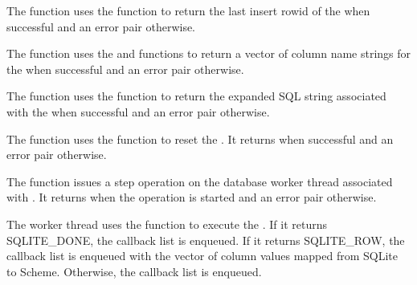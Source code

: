 \begin{function}
\end{function}

The  function uses the
 function to return the last insert
rowid of the  when successful and an error pair
otherwise.

\begin{function}
\end{function}

The  function uses the
 and 
functions to return a vector of column name strings for the
 when successful and an error pair otherwise.

\begin{function}
\end{function}

The  function uses the
 function to return the expanded SQL
string associated with the  when successful and an
error pair otherwise.

\begin{function}
\end{function}

The  function uses the
 function to reset the . It
returns  when successful and an error pair otherwise.

\begin{function}
\end{function}

The  function issues a step operation on
the database worker thread associated with . It returns
 when the operation is started and an error pair otherwise.

The worker thread uses the  function to execute
the . If it returns SQLITE\_DONE, the callback list
 is enqueued. If it returns SQLITE\_ROW,
the callback list  is
enqueued with the vector of column values mapped from SQLite to
Scheme. Otherwise, the callback list  is enqueued.

